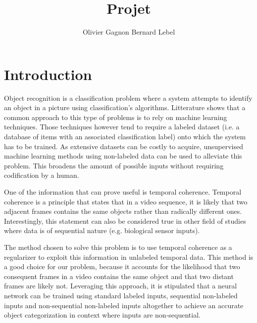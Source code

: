 \documentclass{article} %
\title{Projet}
\author{
Olivier Gagnon \And Bernard Lebel
}
\begin{document}
\maketitle

\begin{abstract}

\end{abstract}

\section{Introduction}

Object recognition is a classification problem where a system attempts to identify an object in a picture using classification's algorithms. Litterature shows that a common approach to this type of problems is to rely on machine learning techniques. Those techniques however tend to require a labeled dataset (i.e. a database of items with an associated classification label) onto which the system has to be trained. As extensive datasets can be costly to acquire, unsupervised machine learning methods using non-labeled data can be used to alleviate this problem. This broadens the amount of possible inputs without requiring codification by a human.

One of the information that can prove useful is temporal coherence. Temporal coherence is a principle that states that in a video sequence, it is likely that two adjacent frames contains the same objects rather than radically different ones. Interestingly, this statement can also be considered true in other field of studies where data is of sequential nature (e.g. biological sensor inputs).

The method chosen to solve this problem is to use temporal coherence as a regularizer to exploit this information in unlabeled temporal data.\cite{Mobahi2009}
This method is a good choice for our problem, because it accounts for the likelihood that two consequent frames in a video contains the same object and that two distant frames are likely not. Leveraging this approach, it is stipulated that a neural network can be trained using standard labeled inputs, sequential non-labeled inputs and non-sequential non-labeled inputs altogether to achieve an accurate object categorization in context where inputs are non-sequential. 
\end{document}
